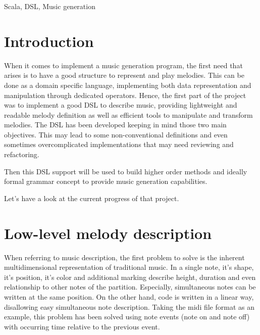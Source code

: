 \documentclass[preprint]{sigplanconf}
\begin{document}


\keywords
Scala, DSL, Music generation

\section{Introduction}

When it comes to implement a music generation program, the first need that arises is to have a good structure to represent and play melodies. This can be done as a domain specific language, implementing both data representation and manipulation through dedicated operators.
Hence, the first part of the project was to implement a good DSL to describe music, providing lightweight and readable melody definition as well as efficient tools to manipulate and transform melodies.
The DSL has been developed keeping in mind those two main objectives. This may lead to some non-conventional definitions and even sometimes overcomplicated implementations that may need reviewing and refactoring.

Then this DSL support will be used to build higher order methods and ideally formal grammar concept to provide music generation capabilities.

Let's have a look at the current progress of that project.



\section{Low-level melody description}

When referring to music description, the first problem to solve is the inherent multidimensional representation of traditional music. In a single note, it's shape, it's position, it's color and additional marking describe height, duration and even relationship to other notes of the partition.
Especially, simultaneous notes can be written at the same position. On the other hand, code is written in a linear way, disallowing easy simultaneous note description. Taking the midi file format as an example, this problem has been solved using note events (note on and note off) with occurring time relative to the previous event.
\end{document}
